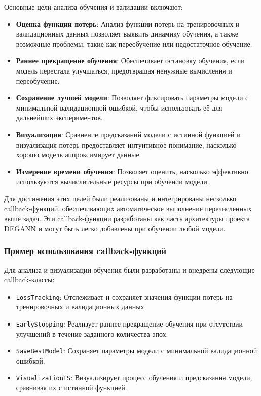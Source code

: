 Основные цели анализа обучения и валидации включают:
\begin{itemize}
    \item \textbf{Оценка функции потерь}: Анализ функции потерь на тренировочных и валидационных данных позволяет выявить динамику обучения, а также возможные проблемы, такие как переобучение или недостаточное обучение.
    \item \textbf{Раннее прекращение обучения}: Обеспечивает остановку обучения, если модель перестала улучшаться, предотвращая ненужные вычисления и переобучение.
    \item \textbf{Сохранение лучшей модели}: Позволяет фиксировать параметры модели с минимальной валидационной ошибкой, чтобы использовать её для дальнейших экспериментов.
    \item \textbf{Визуализация}: Сравнение предсказаний модели с истинной функцией и визуализация потерь предоставляет интуитивное понимание, насколько хорошо модель аппроксимирует данные.
    \item \textbf{Измерение времени обучения}: Позволяет оценить, насколько эффективно используются вычислительные ресурсы при обучении модели.
\end{itemize}

Для достижения этих целей были реализованы и интегрированы несколько callback-функций, обеспечивающих автоматическое выполнение перечисленных выше задач. Эти callback-функции разработаны как часть архитектуры проекта DEGANN и могут быть легко добавлены при обучении любой модели.


\subsubsection{Пример использования callback-функций}

Для анализа и визуализации обучения были разработаны и внедрены следующие callback-классы:
\begin{itemize}
    \item \texttt{LossTracking}: Отслеживает и сохраняет значения функции потерь на тренировочных и валидационных данных.
    \item \texttt{EarlyStopping}: Реализует раннее прекращение обучения при отсутствии улучшений в течение заданного количества эпох.
    \item \texttt{SaveBestModel}: Сохраняет параметры модели с минимальной валидационной ошибкой.
    \item \texttt{VisualizationTS}: Визуализирует процесс обучения и предсказания модели, сравнивая их с истинной функцией.
\end{itemize}

